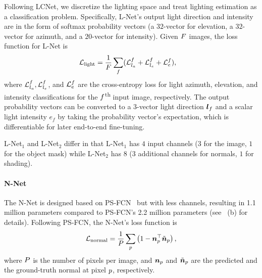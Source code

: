 Following LCNet, we discretize the lighting space and treat lighting estimation as a classification problem. 
Specifically, L-Net's output light direction and intensity are in the form of softmax probability vectors (a $32$-vector for elevation, a $32$-vector for azimuth, and a $20$-vector for intensity).
Given $F$ images, the loss function for L-Net is 
\begin{align}
    \label{eq:light_loss}
    \mathcal{L}_{\text{light}} & =  \frac{1}{F} \sum_{f}(\mathcal{L}^{f}_{l_a} + \mathcal{L}^{f}_{l_e} + \mathcal{L}^{f}_e),
\end{align}
where $\mathcal{L}^{f}_{l_a}, \mathcal{L}^{f}_{l_e}$, and $\mathcal{L}^{f}_{e}$ are the cross-entropy loss for light azimuth, elevation, and intensity classifications for the $f$\textsuperscript{th} input image, respectively. 
The output probability vectors can be converted to a $3$-vector light direction $\boldsymbol{l}_f$ and a scalar light intensity $e_f$ by taking the probability vector's expectation, which is differentiable for later end-to-end fine-tuning.

L-Net$_1$ and L-Net$_2$ differ in that L-Net$_1$ has $4$ input channels ($3$ for the image, $1$ for the object mask) while L-Net$_2$ has $8$ ($3$ additional channels for normals, $1$ for shading).

\paragraph{N-Net} The N-Net is designed based on PS-FCN~\cite{chen2018ps} but with less channels, resulting in \num{1.1} million parameters compared to PS-FCN's \num{2.2} million parameters (see ~(b) for details). Following PS-FCN, the \mbox{N-Net's} loss function is
\begin{align}
    \label{eq:normal_loss}
    \mathcal{L}_{\text{normal}} = \frac{1}{P} \sum_{p} \left(1 - \boldsymbol{n}_{p}^\top \tilde{\boldsymbol{n}}_{p} \right),
\end{align}
where $P$ is the number of pixels per image, and $\boldsymbol{n}_{p}$ and $\tilde{\boldsymbol{n}}_{p}$ are the predicted and the ground-truth normal at pixel $p$, respectively.

